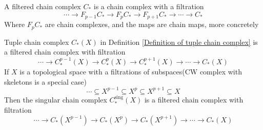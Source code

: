 \documentclass[../main.tex]{subfiles}
\begin{document}
\begin{definition}
A filtered chain complex $C_*$ is a chain complex with a filtration
\[\cdots\to F_{p-1}C_*\to F_pC_*\to F_{p+1}C_*\to\cdots\to C_*\]
Where $F_pC_*$ are chain complexes, and the maps are chain maps, more concretely
\begin{center}
\end{center}
\end{definition}

\begin{example}
Tuple chain complex $C_*(X)$ in Definition \ref{Definition of tuple chain complex} is a filtered chain complex with filtration
\[\cdots\to C^{p-1}_*(X)\to C^{p}_*(X)\to C^{p+1}_*(X)\to\cdots\to C_*(X)\]
If $X$ is a topological space with a filtrations of subspaces(CW complex with skeletons is a special case)
\[\cdots\subseteq X^{p-1}\subseteq X^p\subseteq X^{p+1}\subseteq X\]
Then the singular chain complex $C^{\mathrm{sing}}_*(X)$ is a filtered chain complex with filtration
\[\cdots\to C_*(X^{p-1})\to C_*(X^{p})\to C_*(X^{p+1})\to\cdots\to C_*(X)\]
\end{example}
\end{document}
